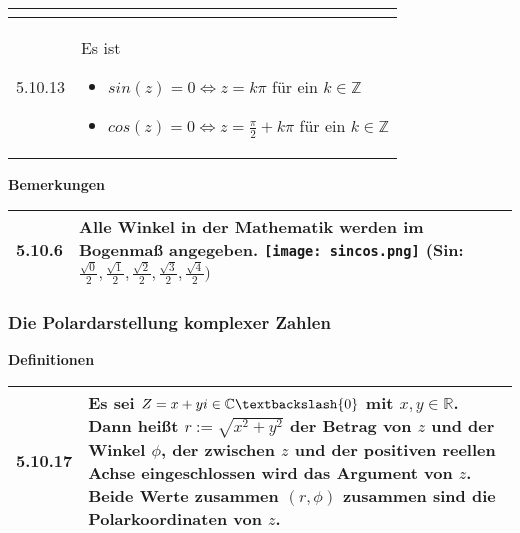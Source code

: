 \begin{table}[H]
\begin{tabularx}{\textwidth}{X m{16cm}}
\begin{itemize}
\begin{itemize}
                                \end{itemize}
                \end{itemize} \\
        \midrule
        5.10.13&Es ist
                \begin{itemize}
                    \item[] $sin(z) = 0 \Leftrightarrow z = k\pi$ für ein $k \in \mathbb{Z}$
                    \item[] $cos(z) = 0 \Leftrightarrow z = \frac{\pi}{2}+k\pi$ für ein $k \in \mathbb{Z}$ 
                \end{itemize} \\

        \bottomrule
    \end{tabularx}
    \end{table}

    \noindent
    \textbf{Bemerkungen}
    \begin{table}[H]
    \begin{tabularx}{\textwidth}{X m{16cm}}
        \toprule

        5.10.6& Alle Winkel in der Mathematik werden im Bogenmaß angegeben. \hfill \break
                \texttt{[image: sincos.png]} \hfill \break
                (Sin: $\frac{\sqrt{0}}{2},\frac{\sqrt{1}}{2},\frac{\sqrt{2}}{2},\frac{\sqrt{3}}{2},\frac{\sqrt{4}}{2})$\\

        \bottomrule
    \end{tabularx}
    \end{table}

\subsubsection{Die Polardarstellung komplexer Zahlen}

    \noindent
    \textbf{Definitionen}
    \begin{table}[H]  
    \begin{tabularx}{\textwidth}{X m{16cm}}
        \toprule

        5.10.17&Es sei $Z = x + yi \in \mathbb{C} \textbackslash \{0\}$ mit $x,y \in \mathbb{R}$. Dann heißt $r:= \sqrt{x^2+y^2}$ der \textbf{Betrag}
                von $z$ und der Winkel $\phi$, der zwischen $z$ und der positiven reellen Achse eingeschlossen wird das \textbf{Argument} von $z$.
                Beide Werte zusammen $(r,\phi)$ zusammen sind die \textbf{Polarkoordinaten} von $z$.\\

        \bottomrule

    \end{tabularx}
    \end{table}

